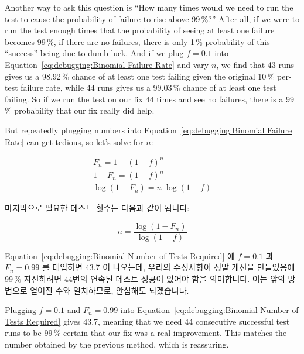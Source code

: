 Another way to ask this question is ``How many times would we need
to run the test to cause the probability of failure to rise above 99\,\%?''
After all, if we were to run the test enough times that the probability
of seeing at least one failure becomes 99\,\%, if there are no failures,
there is only 1\,\% probability of this ``success'' being due to dumb luck.
And if we plug $f=0.1$ into
Equation~\ref{eq:debugging:Binomial Failure Rate} and vary $n$,
we find that 43 runs gives us a 98.92\,\% chance of at least one test failing
given the original 10\,\% per-test failure rate,
while 44 runs gives us a 99.03\,\% chance of at least one test failing.
So if we run the test on our fix 44 times and see no failures, there
is a 99\,\% probability that our fix really did help.

But repeatedly plugging numbers into
Equation~\ref{eq:debugging:Binomial Failure Rate}
can get tedious, so let's solve for $n$:

\fi

\begin{eqnarray}
	F_n = 1-\left(1-f\right)^n \\
	1 - F_n = \left(1-f\right)^n \\
	\log \left(1 - F_n\right) = n \; \log \left(1 - f\right)
\end{eqnarray}

마지막으로 필요한 테스트 횟수는 다음과 같이 됩니다:

\begin{equation}
	n = \frac{\log\left(1 - F_n\right)}{\log\left(1 - f\right)}
\label{eq:debugging:Binomial Number of Tests Required}
\end{equation}

Equation~\ref{eq:debugging:Binomial Number of Tests Required}
에 $f=0.1$ 과 $F_n=0.99$ 를 대입하면 43.7 이 나오는데, 우리의 수정사항이 정말
개선을 만들었음에 99\,\% 자신하려면 44번의 연속된 테스트 성공이 있어야 함을
의미합니다.
이는 앞의 방법으로 얻어진 수와 일치하므로, 안심해도 되겠습니다.

\iffalse

Plugging $f=0.1$ and $F_n=0.99$ into
Equation~\ref{eq:debugging:Binomial Number of Tests Required}
gives 43.7, meaning that we need 44 consecutive successful test
runs to be 99\,\% certain that our fix was a real improvement.
This matches the number obtained by the previous method, which
is reassuring.

